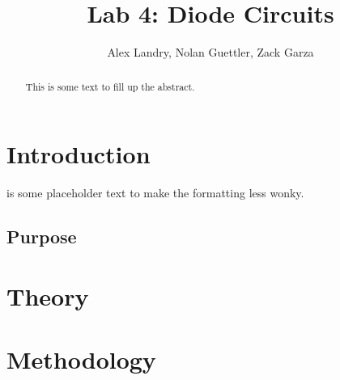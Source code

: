 \documentclass[twocolumn,english]{IEEEtran}
\begin{document}
\title{Lab 4: Diode Circuits}
\author{Alex Landry, Nolan Guettler, Zack Garza} %

\maketitle

\begin{abstract}
This is some text to fill up the abstract.
\end{abstract}

\tableofcontents

\section{Introduction}
 is some placeholder text to make the formatting less wonky.
\subsection{Purpose}

\section{Theory}

\section{Methodology}
\end{document}

